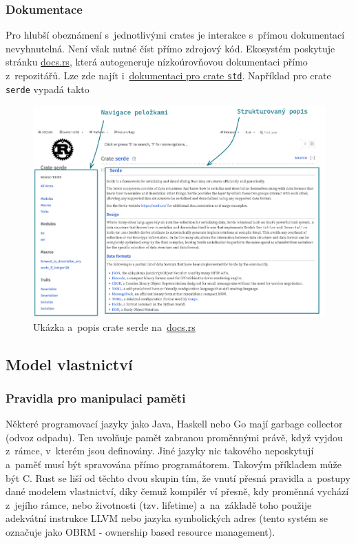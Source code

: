 \documentclass[a4paper, 12pt, twoside]{article} %
\newcommand{\rust}[1]{\texttt{#1}}
\begin{document}
		\subsubsection*{Dokumentace}
			Pro hlubší obeznámení s~jednotlivými crates je interakce s~přímou dokumentací nevyhnutelná. Není však nutné číst přímo zdrojový kód. Ekosystém poskytuje stránku \href{https://docs.rs}{docs.rs}, která autogeneruje nízkoúrovňovou dokumentaci přímo z~repozitářů. Lze zde najít i~\href{https://docs.rs/rustc-std-workspace-std/latest/std/index.html}{dokumentaci pro crate \rust{std}}. Například pro crate \rust{serde} vypadá takto
			
			\begin{center}
				\begin{figure}[H]
					\centering
					\includegraphics[width=\linewidth]{docsrs}
					\caption{Ukázka a~popis crate serde na~\href{https://docs.rs}{docs.rs}}
					\label{fig:docsrs}
				\end{figure}
			\end{center}

	\subsection{Model vlastnictví}
		\subsubsection*{Pravidla pro manipulaci paměti}
			Některé programovací jazyky jako Java, Haskell nebo Go mají garbage collector (odvoz odpadu). Ten uvolňuje pamět zabranou proměnnými právě, když vyjdou z~rámce, v~kterém jsou definovány. Jiné jazyky nic takového neposkytují a~paměť musí být spravována přímo programátorem. Takovým příkladem může být C. Rust se liší od těchto dvou skupin tím, že vnutí přesná pravidla a~postupy dané modelem vlastnictví, díky čemuž kompilér ví přesně, kdy proměnná vychází z~jejího rámce, nebo životnosti (tzv. lifetime) a~na~základě toho použije adekvátní instrukce LLVM nebo jazyka symbolických adres (tento systém se označuje jako OBRM - ownership based resource management).
		
\end{document}
